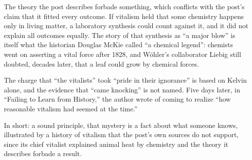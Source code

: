 \begin{afterword}
The theory the post describes forbade something, which conflicts with the post's claim that it fitted every outcome. If vitalism held that some chemistry happens only in living matter, a laboratory synthesis could count against it, and it did not explain all outcomes equally. The story of that synthesis as ``a major blow'' is itself what the historian Douglas McKie called ``a chemical legend'': chemists went on asserting a vital force after 1828, and Wöhler's collaborator Liebig still doubted, decades later, that a leaf could grow by chemical forces.

The charge that ``the vitalists'' took ``pride in their ignorance'' is based on Kelvin alone, and the evidence that ``came knocking'' is not named. Five days later, in ``Failing to Learn from History,'' the author wrote of coming to realize ``how reasonable vitalism had seemed at the time.''

In short: a sound principle, that mystery is a fact about what someone knows, illustrated by a history of vitalism that the post's own sources do not support, since its chief vitalist explained animal heat by chemistry and the theory it describes forbade a result.
\end{afterword}
